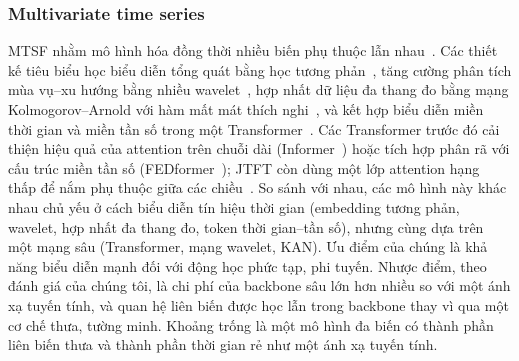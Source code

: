 \documentclass[conference]{IEEEtran}
\begin{document}
\subsubsection{Multivariate time series}
MTSF nhằm mô hình hóa đồng thời nhiều biến phụ thuộc lẫn nhau~\cite{Kim2025Survey}. Các thiết kế tiêu biểu học biểu diễn
tổng quát bằng học tương phản~\cite{Hu2023Contrastive}, tăng cường phân tích mùa vụ--xu hướng bằng nhiều
wavelet~\cite{Zhang2025MWENet}, hợp nhất dữ liệu đa thang đo bằng mạng Kolmogorov--Arnold với hàm mất mát thích
nghi~\cite{Liu2026MSDFKAN}, và kết hợp biểu diễn miền thời gian và miền tần số trong một Transformer~\cite{Chen2024JTFT}.
Các Transformer trước đó cải thiện hiệu quả của attention trên chuỗi dài (Informer~\cite{Zhou2021Informer}) hoặc tích hợp
phân rã với cấu trúc miền tần số (FEDformer~\cite{Zhou2022FEDformer}); JTFT còn dùng một lớp attention hạng thấp để nắm
phụ thuộc giữa các chiều~\cite{Chen2024JTFT}. So sánh với nhau, các mô hình này khác nhau chủ yếu ở cách biểu diễn tín
hiệu thời gian (embedding tương phản, wavelet, hợp nhất đa thang đo, token thời gian--tần số), nhưng cùng dựa trên một
mạng sâu (Transformer, mạng wavelet, KAN). Ưu điểm của chúng là khả năng biểu diễn mạnh đối với động học phức tạp, phi
tuyến. Nhược điểm, theo đánh giá của chúng tôi, là chi phí của backbone sâu lớn hơn nhiều so với một ánh xạ tuyến tính,
và quan hệ liên biến được học lẫn trong backbone thay vì qua một cơ chế thưa, tường minh. Khoảng trống là một mô hình đa
biến có thành phần liên biến thưa và thành phần thời gian rẻ như một ánh xạ tuyến tính.
\end{document}
